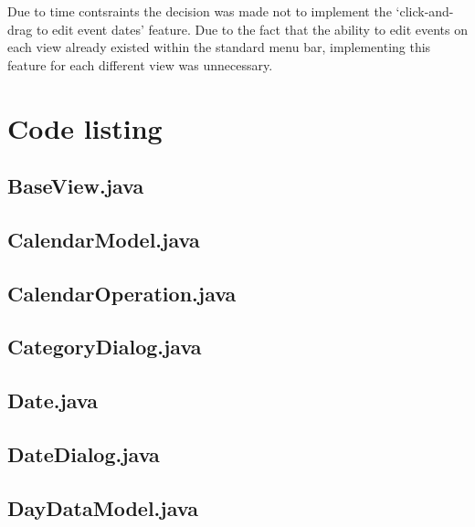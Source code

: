 \documentclass{article}
\begin{document}
Due to time contsraints the decision was made not to implement the
`click-and-drag to edit event dates' feature. Due to the fact that the
ability to edit events on each view already existed within the standard
menu bar, implementing this feature for each different view was
unnecessary.


\appendix

\section{Code listing}

\subsection{BaseView.java}



\subsection{CalendarModel.java}



\subsection{CalendarOperation.java}



\subsection{CategoryDialog.java}



\subsection{Date.java}



\subsection{DateDialog.java}



\subsection{DayDataModel.java}
\end{document}
